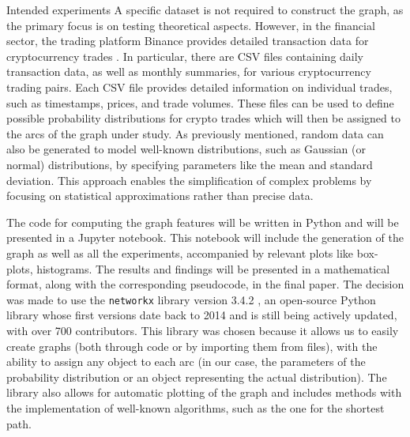 \begin{projsection}{Intended experiments}
A specific dataset is not required to construct the graph, as the primary focus is on testing theoretical aspects. However, in the financial sector, the trading platform Binance provides detailed transaction data for cryptocurrency trades \cite{Binance}.
In particular, there are CSV files containing daily transaction data, as well as monthly summaries, for various cryptocurrency trading pairs. Each CSV file provides detailed information on individual trades, such as timestamps, prices, and trade volumes. These files can be used to define possible probability distributions for crypto trades which will then be assigned to the arcs of the graph under study.
As previously mentioned, random data can also be generated to model well-known distributions, such as Gaussian (or normal) distributions, by specifying parameters like the mean and standard deviation. This approach enables the simplification of complex problems by focusing on statistical approximations rather than precise data.

The code for computing the graph features will be written in Python and will be presented in a Jupyter notebook. This notebook will include the generation of the graph as well as all the experiments, accompanied by relevant plots like box-plots, histograms. The results and findings will be presented in a mathematical format, along with the corresponding pseudocode, in the final paper. 
The decision was made to use the \texttt{networkx} library version 3.4.2 \cite{Networkx}, an open-source Python library whose first versions date back to 2014 and is still being actively updated, with over 700 contributors. This library was chosen because it allows us to easily create graphs (both through code or by importing them from files), with the ability to assign any object to each arc (in our case, the parameters of the probability distribution or an object representing the actual distribution). The library also allows for automatic plotting of the graph and includes methods with the implementation of well-known algorithms, such as the one for the shortest path.

\end{projsection}